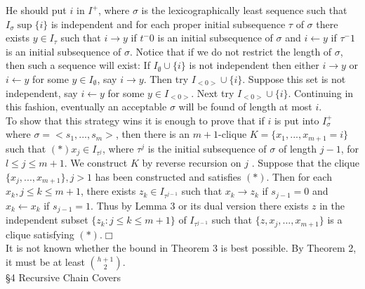 \documentclass[twoside]{article}
\begin{document}
He   should put   $i$   in   $I^+$, where  $\sigma$   is the lexicographically least sequence such that   $I_\sigma \sup \{i\}$ is independent and for each proper initial subsequence  $\tau$   of $\sigma$   there exists   $y\in I_\tau$   such that $i\rightarrow y$ if   $t^-0$   is an initial subsequence of $\sigma$   and   $i\leftarrow y$   if   $\tau^-1$   is an initial subsequence of   $\sigma$. 
Notice that if we do not restrict the length of $\sigma$, then such a sequence will exist: If $I_\emptyset \cup \{i\}$ is not independent then either $i \rightarrow y$ or $i \leftarrow y$ for some $y \in I_\emptyset$, say $i \rightarrow y$. Then try $I_{<0>} \cup \{i\}$. 
Suppose this set is not independent, say $i \leftarrow y$ for some $y \in I_{<0>}$. Next try
$I_{<0>} \cup \{i\}$. Continuing in this fashion, eventually an acceptable $\sigma$ will be found of length at most $i$.\\
\indent To show that this strategy wins it is enough to prove that if   $i$   is put
into   $I_\sigma^+$   where   $\sigma = <s_1,...,s_m>$, then there is an $m+1$-clique
$K=\{x_1,...,x_{m+1}=i\}$ such that $(*) x_j \in I_{\tau^j}$, where $\tau^j$ is the initial subsequence
of  $\sigma$  of length $j-1$, for   $l\leq j\leq m+1$.   We construct   $K$   by reverse recursion on
$j$ .    Suppose that the clique $\{x_j,...,x_{m+1}\}, j>1$ has been constructed and
satisfies $(*)$.   Then for each   $x_k, j\leq k\leq m+1$, there exists   $z_k\in I_{\tau^{j-1}}$   such that
$x_k \rightarrow z_k$ if   $s_{j-1}=0$   and  $x_k \leftarrow x_k$	if $s_{j-1} = 1$.   Thus by Lemma 3 or its dual
version there exists   $z$   in the independent subset $\{z_k:j\leq k \leq m+1\}$   of $I_{\tau^{j-1}}$ such that $\{z,x_j,...,x_{m+1}\}$    is a clique satisfying $(*)$.$\Box$\\


It is not known whether the bound in Theorem 3 is best possible. By Theorem 2, it must be at least $\binom{h+1}{2}$.\\


\noindent\S 4 Recursive Chain Covers\\
\end{document}
